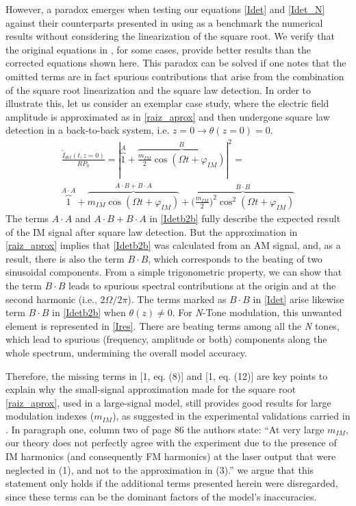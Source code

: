 \documentclass[journal]{IEEEtran}
\begin{document}
However, a paradox emerges when testing our equations \eqref{Idet} and \eqref{Idet_N} against their counterparts presented in \cite{eva} using as a benchmark the numerical results without considering the linearization of the square root. We verify that the original equations in \cite{eva}, for some cases, provide better results than the corrected equations shown here. This paradox can be solved if one notes that the omitted terms are in fact spurious contributions that arise from the combination of the square root linearization and the square law detection. In order to illustrate this, let us consider an exemplar case study, where the electric field amplitude is approximated as in \eqref{raiz_aprox} and then undergone square law detection in a back-to-back system, i.e. $z = 0 \rightarrow \theta(z = 0) = 0$.
\begin{align} \label{Idetb2b} \nonumber
\frac{\tilde{I}_{det}(t, z = 0)}{RP_0} = |\overbrace{1}^{A} + \overbrace{\frac{m_{IM}}{2}\cos(\Omega t + \varphi_{IM})}^{B}|^2 = \\
\overbrace{1}^{A\cdot A} + \overbrace{m_{IM}\cos(\Omega t + \varphi_{IM})}^{A\cdot B + B\cdot A} + \overbrace{\Big(\frac{m_{IM}}{2}\Big)^2\cos^2(\Omega t + \varphi_{IM})}^{B\cdot B}
\end{align}
The terms $A\cdot A$ and $A\cdot B + B\cdot A$ in \eqref{Idetb2b} fully describe the expected result of the IM signal after square law detection. But the approximation in \eqref{raiz_aprox} implies that \eqref{Idetb2b} was calculated from an AM signal, and, as a result, there is also the term $B\cdot B$, which corresponds to the beating of two sinusoidal components. From a simple trigonometric property, we can show that the term $B\cdot B$ leads to spurious spectral contributions at the origin and at the second harmonic (i.e., $2\Omega/2\pi$). The terms marked as $B\cdot B$ in \eqref{Idet} arise likewise term $B\cdot B$ in \eqref{Idetb2b} when $\theta(z) \neq 0$. For \emph{N}-Tone modulation, this unwanted element is represented in \eqref{Ires}. There are beating terms among all the \emph{N} tones, which lead to spurious (frequency, amplitude or both) components along the whole spectrum, undermining the overall model accuracy.

Therefore, the missing terms in [1, eq. (8)] and [1, eq. (12)] are key points to explain why the small-signal approximation made for the square root \eqref{raiz_aprox}, used in a large-signal model, still provides good results for large modulation indexes ($m_{IM}$), as suggested in the experimental validations carried in \cite{eva}. In paragraph one, column two of page 86 the authors state: ``At very large $m_{IM}$, our theory does not perfectly agree with the experiment due to the presence of IM harmonics (and consequently FM harmonics) at the laser output that were neglected in (1), and not to the approximation in (3).'' we argue that this statement only holds if the additional terms presented herein were disregarded, since these terms can be the dominant factors of the model's inaccuracies. 
\end{document}
